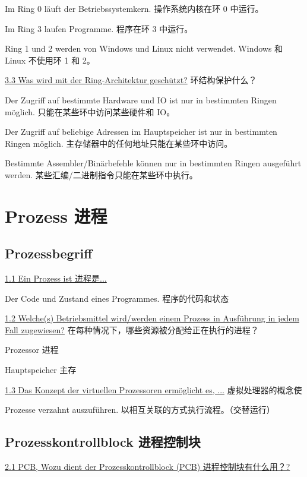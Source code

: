 \documentclass[fleqn]{article}
\begin{document}
Im Ring 0 läuft der Betriebssystemkern.
操作系统内核在环 0 中运行。

Im Ring 3 laufen Programme.
程序在环 3 中运行。

Ring 1 und 2 werden von Windows und Linux nicht verwendet.
Windows 和 Linux 不使用环 1 和 2。

\noindent\uline{3.3 Was wird mit der Ring-Architektur geschützt?}
环结构保护什么？

Der Zugriff auf bestimmte Hardware und IO ist nur in bestimmten Ringen möglich.
只能在某些环中访问某些硬件和 IO。

Der Zugriff auf beliebige Adressen im Hauptspeicher ist nur in bestimmten Ringen möglich.
主存储器中的任何地址只能在某些环中访问。

Bestimmte Assembler/Binärbefehle können nur in bestimmten Ringen ausgeführt werden.
某些汇编/二进制指令只能在某些环中执行。



\section{Prozess 进程}

\subsection{Prozessbegriff}

\noindent\uline{1.1	Ein Prozess ist 进程是...}

Der Code und Zustand eines Programmes. 程序的代码和状态

\noindent\uline{1.2 Welche(s) Betriebsmittel wird/werden einem Prozess in Ausführung in jedem Fall zugewiesen?}
在每种情况下，哪些资源被分配给正在执行的进程？

Prozessor 进程

Hauptspeicher 主存

\noindent\uline{1.3 Das Konzept der virtuellen Prozessoren ermöglicht es, ...}
虚拟处理器的概念使

Prozesse verzahnt auszuführen.
以相互关联的方式执行流程。（交替运行）

\subsection{Prozesskontrollblock 进程控制块}

\noindent\uline{2.1 PCB, Wozu dient der Prozesskontrollblock (PCB) 进程控制块有什么用？?}
	
\end{document}
